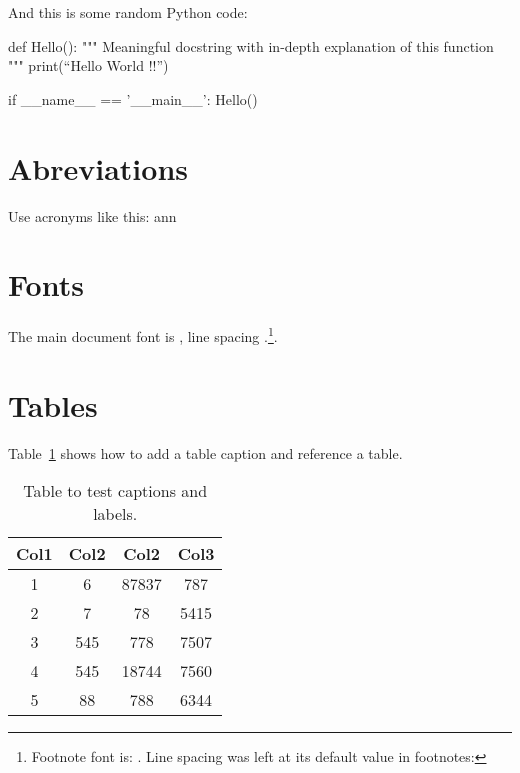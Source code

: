 And this is some random Python code:

\begin{python}
def Hello():
    """
      Meaningful docstring with in-depth explanation of this function
    """
    print(``Hello World !!'')

if __name__ == '__main__':
    Hello()
\end{python}

\section{Abreviations}

\begin{acronym}
\end{acronym}

Use acronyms like this: \ac{ann}

\section{Fonts}

The main document font is \fontname\font, line spacing \the\baselineskip.\footnote{Footnote font is: \fontname\font
. Line spacing was left at its default value in footnotes: \the\baselineskip}.

\section{Tables}

Table~\ref{table:data} shows how to add a table caption and reference a table.
\begin{table}[h!]
\centering
\begin{tabular}{||c c c c||} 
 \hline
 Col1 & Col2 & Col2 & Col3 \\ [0.5ex] 
 \hline\hline
 1 & 6 & 87837 & 787 \\ 
 2 & 7 & 78 & 5415 \\
 3 & 545 & 778 & 7507 \\
 4 & 545 & 18744 & 7560 \\
 5 & 88 & 788 & 6344 \\ [1ex] 
 \hline
\end{tabular}
\caption{Table to test captions and labels.}
\label{table:data}
\end{table}

